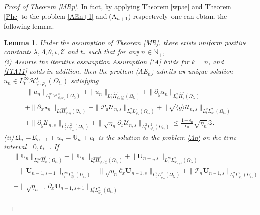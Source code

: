 \documentclass{amsart}
\numberwithin{equation}{section}
\newtheorem{lemma}{Lemma}[section]
\newcommand\y{{{\langle y \rangle}}}
\begin{document}
\begin{proof}[Proof of Theorem \ref{MRp}]
In fact, by applying Theorem \ref{wpae} and Theorem \ref{Phe} to the problem \eqref{AEn+1} and (A$_{n+1}$) respectively, one can obtain the following lemma.
\begin{lemma}\label{IT}
Under the assumption of Theorem \ref{MR}, there exists uniform positive constants $\lambda, \Lambda, \theta, \iota, \mathcal{Z}$ and $t_{*}$ such that for any $n\in\mathbb{N}_{+}$, \\
(i) Assume the iterative assumption Assumption \ref{IA} holds for $k=n$, and \eqref{ITA11} holds in addition, then the problem \textsc{(AE$_{n}$)} admits an unique solution
$u_{n}\in L_{t}^{\infty}\mathcal{H}_{\psi,\varphi_{n}}^{s}(\Omega_{t_{*}})$ satisfying
\begin{align}\label{ITC1}
&~\|u_{n}\|_{L_{t}^{\infty}\mathcal{H}_{\psi,\varphi_{n}}^{s}(\Omega_{t_{*}})}
 +\|u_{n}\|_{L_{t}^{2}\hat{H}_{\psi,\y}^{s}(\Omega_{t_{*}})}
 +\|\partial_{y}u_{n}\|_{L_{t}^{2}\hat{H}_{\psi}^{s}(\Omega_{t_{*}})}\\
&+\|\partial_{x}u_{n}\|_{L_{t}^{2}\hat{H}_{\psi,\eta}^{s}(\Omega_{t_{*}})}
 +\|\mathcal{P}_{n}\mathcal{U}_{n,s}\|_{L_{t}^{2}L_{\varphi_{n}}^{2}(\Omega_{t_{*}})}
 +\|\sqrt{\y}\mathcal{U}_{n,s}\|_{L_{t}^{2}L_{\varphi_{n}}^{2}(\Omega_{t_{*}})}\nonumber\\
&+\|\partial_{y}\mathcal{U}_{n,s}\|_{L_{t}^{2}L_{\varphi_{n}}^{2}(\Omega_{t_{*}})}
 +\|\sqrt{\eta_{n}}\partial_{x}\mathcal{U}_{n,s}\|_{L_{t}^{2}L_{\varphi_{n}}^{2}(\Omega_{t_{*}})}
\leq \frac{1-\epsilon_{0}}{\epsilon_{0}}\sqrt{\bar{\eta}_{n}}\mathcal{Z}.\nonumber
\end{align}
(ii) $\mathfrak{U}_{n}=\mathfrak{U}_{n-1}+u_{n}=\mathbb{U}_{n}+u_{0}$ is the solution to the problem \eqref{An} on the time interval $[0,t_{*}]$. If
\begin{align}\label{ITA12}
~&\|\mathbb{U}_{n}\|_{L_{t}^{\infty}\hat{H}_{\psi}^{s}(\Omega_{t_{*}})}
+\|\mathbb{U}_{n}\|_{L_{t}^{2}\hat{H}_{\psi,\y}^{s}(\Omega_{t_{*}})}
+\|\mathbf{U}_{n-1,s}\|_{L_{t}^{\infty}L_{\varphi_{n+1}}^{2}(\Omega_{t_{*}})}\\
&+\|\mathbf{U}_{n-1,s+1}\|_{L_{t}^{\infty}L_{\hat{\varphi}_{n}}^{2}(\Omega_{t_{*}})}
+\|\sqrt{\eta_{n}}\partial_{x}\mathbf{U}_{n-1,s}\|_{L_{t}^{2}L_{\varphi_{n}}^{2}(\Omega_{t_{*}})}
+\|\mathcal{P}_{n}\mathbf{U}_{n-1,s}\|_{L_{t}^{2}L_{\varphi_{n}}^{2}(\Omega_{t_{*}})}\nonumber\\
&+\|\sqrt{\eta_{n-1}}\partial_{x}\mathbf{U}_{n-1,s+1}\|_{L_{t}^{2}L_{\hat{\varphi}_{n}}^{2}(\Omega_{t_{*}})}

\end{align}
\end{lemma}
\end{proof}
\end{document}
